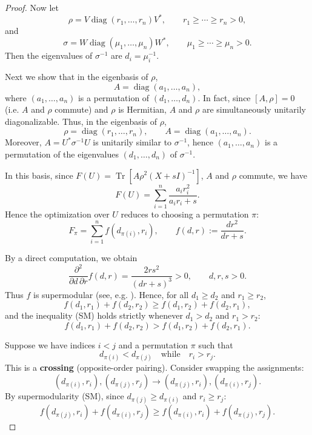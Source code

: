 \documentclass[10pt,reqno]{amsart}
\theoremstyle{break-italic}
\theoremstyle{break-italic}
\theoremstyle{break-italic}
\theoremstyle{break-italic}
\theoremstyle{break-italic}
\theoremstyle{break-italic}
\theoremstyle{break-italic}
\theoremstyle{break-italic}
\theoremstyle{break-roman}
\theoremstyle{standard}
\theoremstyle{varthm-roman}
\theoremstyle{varthm-italic}
\theoremstyle{varthm-roman-break}
\theoremstyle{varthm-italic-break}
\theoremstyle{varthm-roman-no-punctuation}
\theoremstyle{varthm-italic-no-punctuation}
\numberwithin{equation}{section}
\begin{document}
\begin{proof}
Now let
\[
\rho = V\operatorname{diag}(r_1,\dots,r_n)V^*,\qquad
r_1\ge\cdots\ge r_n>0,
\]
and
\[
\sigma = W\operatorname{diag}(\mu_1,\dots,\mu_n)W^*,\qquad
\mu_1\ge\cdots\ge\mu_n>0.
\]
Then the eigenvalues of $\sigma^{-1}$ are $d_i=\mu_i^{-1}$.

Next we show that in the eigenbasis of $\rho$,
\[
A=\operatorname{diag}(a_1,\dots,a_n),
\]
where $(a_1,\dots,a_n)$ is a permutation of $(d_1,\dots,d_n)$. In fact, since $[A,\rho]=0$ (i.e. $A$ and $\rho$ commute) and $\rho$ is Hermitian, $A$ and $\rho$ are simultaneously
unitarily diagonalizable. Thus, in the eigenbasis of $\rho$,
\[
\rho=\operatorname{diag}(r_1,\dots,r_n),\qquad
A=\operatorname{diag}(a_1,\dots,a_n).
\]
Moreover, $A=U^*\sigma^{-1}U$ is unitarily similar to $\sigma^{-1}$, hence
$(a_1,\dots,a_n)$ is a permutation of the eigenvalues
$(d_1,\dots,d_n)$ of $\sigma^{-1}$.

In this basis, since $F(U)=\operatorname{Tr}\!\left[A\rho^2(X+sI)^{-1}\right]$, $A$ and $\rho$ commute, we have
$$
F(U)
=\sum_{i=1}^n \frac{a_i r_i^2}{a_i r_i+s}.
$$
Hence the optimization over $U$ reduces to choosing a permutation $\pi$:
$$
F_\pi
=\sum_{i=1}^n f(d_{\pi(i)},r_i),
\qquad
f(d,r):=\frac{dr^2}{dr+s}.
$$

By a direct computation, we obtain 
\[
\frac{\partial^2}{\partial d\,\partial r}f(d,r)
=\frac{2rs^2}{(dr+s)^3}>0,
\qquad d,r,s>0.
\]
Thus $f$ is supermodular (see, e.g. \cite{Top98}). Hence, for all $d_1 \ge d_2$ and $r_1 \ge r_2$,
\begin{equation}
f(d_1, r_1) + f(d_2, r_2) \ge f(d_1, r_2) + f(d_2, r_1), \tag{SM}
\end{equation}
and the inequality (SM) holds strictly whenever $d_1 > d_2$ and $r_1 > r_2$:
\begin{equation*}
f(d_1, r_1) + f(d_2, r_2) > f(d_1, r_2) + f(d_2, r_1).
\end{equation*}

Suppose we have indices $i < j$ and a permutation $\pi$ such that 
\begin{equation*}
d_{\pi(i)} < d_{\pi(j)} \quad \text{while} \quad r_i > r_j.
\end{equation*}
This is a \textbf{crossing} (opposite-order pairing). Consider swapping the assignments:
\begin{equation*}
(d_{\pi(i)}, r_i), (d_{\pi(j)}, r_j) \longrightarrow (d_{\pi(j)}, r_i), (d_{\pi(i)}, r_j).
\end{equation*}
By supermodularity (SM), since $d_{\pi(j)} \ge d_{\pi(i)}$ and $r_i \ge r_j$:
\begin{equation*}
f(d_{\pi(j)}, r_i) + f(d_{\pi(i)}, r_j) \ge f(d_{\pi(i)}, r_i) + f(d_{\pi(j)}, r_j).
\end{equation*}


\end{proof}
\end{document}
